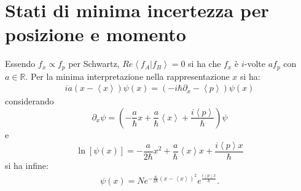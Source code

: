 


%

\section{Stati di minima incertezza per posizione e momento} %
Essendo $f_x\propto f_p$ per Schwartz, $Re\left\langle f_A|f_B \right\rangle=0$ si ha che $f_x$ è $i$-volte $af_p$ con $a\in\mathbb{R} $. Per la minima interpretazione nella rappresentazione $x$ si ha:
\begin{equation}\begin{split}
ia\left(x-\left\langle x \right\rangle\right)\psi \left(x\right)=\left(-i\hbar \partial _x-\left\langle p \right\rangle\right)\psi \left(x\right)
\end{split}\end{equation}
considerando \[\partial _x\psi =\left(-\frac{a}{\hbar }x+\frac{a}{\hbar }\left\langle x \right\rangle+\frac{i\left\langle p \right\rangle}{\hbar }\right)\psi \] e \[\ln{\left[\psi \left(x\right)\right]}=-\frac{a}{2\hbar }x^2+\frac{a}{\hbar }\left\langle x \right\rangle x+\frac{i\left\langle p \right\rangle x}{\hbar }\] si ha infine:
\begin{equation}\begin{split}
\psi \left(x\right)=Ne^{-\frac{a}{2\hbar }\left(x-\left\langle x \right\rangle\right)^2}e^{\frac{i\left\langle p \right\rangle x}{\hbar }}.
\end{split}\end{equation}

